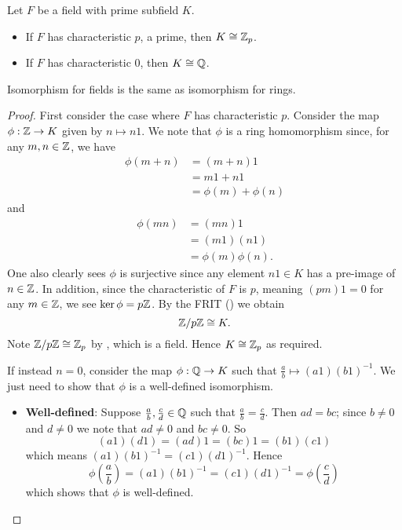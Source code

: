 \begin{theorem}\label{thrm-prime-subfield-isomorphic-to-Zp-or-Q}
    Let $F$ be a field with prime subfield $K$.
    \begin{itemize}
        \item If $F$ has characteristic $p$, a prime, then $K \cong \mathbb{Z}_p$.
        \item If $F$ has characteristic 0, then $K \cong \mathbb{Q}$.
    \end{itemize}
\end{theorem}
\begin{remark}
    Isomorphism for fields is the same as isomorphism for rings.
\end{remark}
\begin{proof}
    First consider the case where $F$ has characteristic $p$. Consider the map $\phi: \mathbb{Z} \to K$ given by $n \mapsto n1$. We note that $\phi$ is a ring homomorphism since, for any $m, n \in \mathbb{Z}$, we have
    \begin{align*}
        \phi(m + n) &= (m + n)1\\
        &= m1 + n1\\
        &= \phi(m) + \phi(n)
    \end{align*}
    and
    \begin{align*}
        \phi(mn) &= (mn)1\\
        &= (m1)(n1)\\
        &= \phi(m)\phi(n).
    \end{align*}
    One also clearly sees $\phi$ is surjective since any element $n1 \in K$ has a pre-image of $n \in \mathbb{Z}$. In addition, since the characteristic of $F$ is $p$, meaning $(pm)1 = 0$ for any $m \in \mathbb{Z}$, we see $\ker\phi = p\mathbb{Z}$. By the FRIT () we obtain
    \[
        \mathbb{Z}/p\mathbb{Z} \cong K.
    \]
    Note $\mathbb{Z}/p\mathbb{Z} \cong \mathbb{Z}_p$ by , which is a field. Hence $K \cong \mathbb{Z}_p$ as required.

    If instead $n = 0$, consider the map $\phi: \mathbb{Q} \to K$ such that $\frac ab \mapsto (a1)(b1)^{-1}$. We just need to show that $\phi$ is a well-defined isomorphism.
    \begin{itemize}
        \item \textbf{Well-defined}: Suppose $\frac ab, \frac cd \in \mathbb{Q}$ such that $\frac ab = \frac cd$. Then $ad = bc$; since $b \neq 0$ and $d \neq 0$ we note that $ad \neq 0$ and $bc \neq 0$. So
        \[
            (a1)(d1) = (ad)1 = (bc)1 = (b1)(c1)
        \]
        which means $(a1)(b1)^{-1} = (c1)(d1)^{-1}$. Hence
        \[
            \phi\left(\frac ab\right) = (a1)(b1)^{-1} = (c1)(d1)^{-1} = \phi\left(\frac cd\right)
        \]
        which shows that $\phi$ is well-defined.


\end{itemize}
\end{proof}
